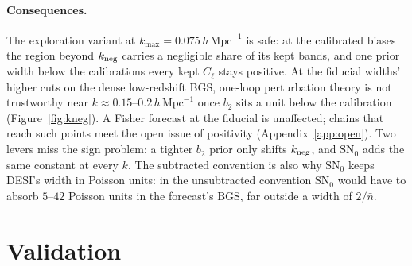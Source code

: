 \documentclass[11pt]{article}
\newcommand{\btwo}{b_2}            %
\newcommand{\kmax}{k_{\mathrm{max}}}
\newcommand{\hMpc}{\,h\,\mathrm{Mpc}^{-1}}
\newcommand{\SNz}{\mathrm{SN}_0}
\begin{document}
\paragraph{Consequences.}
The exploration variant at $\kmax = 0.075\hMpc$ is safe: at the
calibrated biases the
region beyond $k_{\rm neg}$ carries a negligible share of its kept
bands, and one prior width below the calibrations every kept $C_\ell$
stays positive.  At the fiducial widths' higher cuts on the dense
low-redshift
BGS, one-loop perturbation theory is not trustworthy near
$k \approx 0.15$--$0.2\hMpc$ once $\btwo$ sits a unit below the
calibration (Figure~\ref{fig:kneg}).  A Fisher forecast at the
fiducial is unaffected; chains that reach such points meet the open
issue of positivity (Appendix~\ref{app:open}).  Two levers miss the
sign problem: a tighter $\btwo$ prior only shifts $k_{\rm neg}$, and
$\SNz$ adds the same constant at every $k$.  The subtracted convention
is also why $\SNz$ keeps DESI's width in Poisson units: in the
unsubtracted convention $\SNz$ would have to absorb $5$--$42$ Poisson
units in the forecast's BGS, far outside a width of $2/\bar{n}$.

\section{Validation}
\label{sec:validation}
\end{document}
